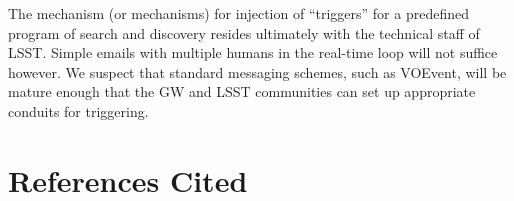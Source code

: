 \documentclass [11pt]{article}
\begin{document}
The mechanism (or mechanisms) for injection of ``triggers'' for a predefined program of search and discovery resides ultimately with the technical staff of LSST. Simple emails with multiple humans in the real-time loop will not suffice however. We suspect that standard messaging schemes, such as VOEvent, will be mature enough that the GW and LSST communities can set up appropriate conduits for triggering.


\section{References Cited}

%
%

\end{document}
